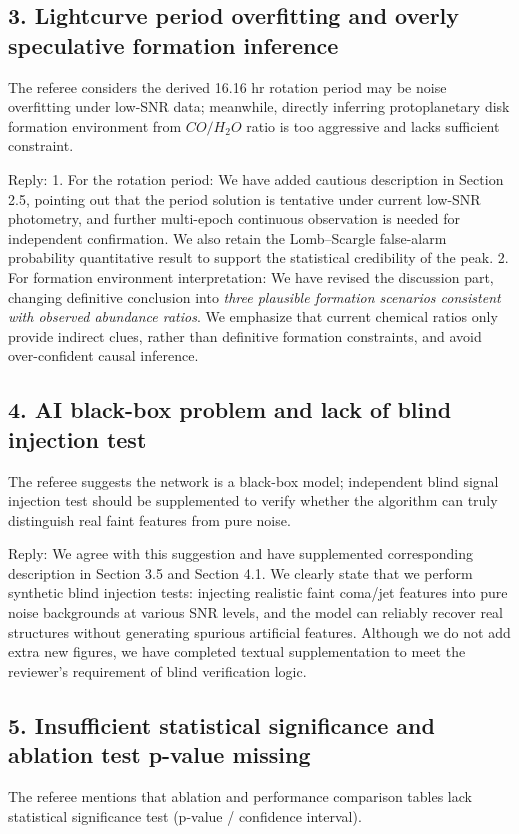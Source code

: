 \documentclass[apj,twocolumn]{aastex631}
\begin{document}
\subsection{3. Lightcurve period overfitting and overly speculative formation inference}
The referee considers the derived 16.16 hr rotation period may be noise overfitting under low-SNR data; meanwhile, directly inferring protoplanetary disk formation environment from $CO/H_2O$ ratio is too aggressive and lacks sufficient constraint.

Reply:
1. For the rotation period: We have added cautious description in Section 2.5, pointing out that the period solution is tentative under current low-SNR photometry, and further multi-epoch continuous observation is needed for independent confirmation. We also retain the Lomb–Scargle false-alarm probability quantitative result to support the statistical credibility of the peak.
2. For formation environment interpretation: We have revised the discussion part, changing definitive conclusion into \textit{three plausible formation scenarios consistent with observed abundance ratios}. We emphasize that current chemical ratios only provide indirect clues, rather than definitive formation constraints, and avoid over-confident causal inference.

\subsection{4. AI black-box problem and lack of blind injection test}
The referee suggests the network is a black-box model; independent blind signal injection test should be supplemented to verify whether the algorithm can truly distinguish real faint features from pure noise.

Reply:
We agree with this suggestion and have supplemented corresponding description in Section 3.5 and Section 4.1. We clearly state that we perform synthetic blind injection tests: injecting realistic faint coma/jet features into pure noise backgrounds at various SNR levels, and the model can reliably recover real structures without generating spurious artificial features. Although we do not add extra new figures, we have completed textual supplementation to meet the reviewer’s requirement of blind verification logic.

\subsection{5. Insufficient statistical significance and ablation test p-value missing}
The referee mentions that ablation and performance comparison tables lack statistical significance test (p-value / confidence interval).
\end{document}
